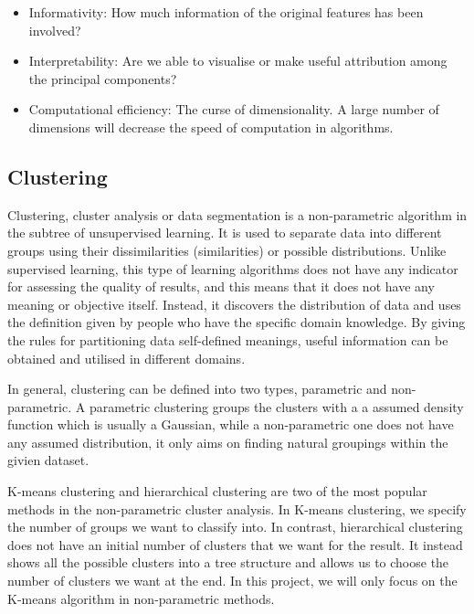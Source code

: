 \documentclass[11pt]{article} %
\theoremstyle{plain}
\theoremstyle{definition}
\begin{document}
\begin{itemize}
  \item Informativity: How much information of the original features has been involved?
  \item Interpretability: Are we able to visualise or make useful attribution among the principal components?
  \item Computational efficiency: The curse of dimensionality. A large number of dimensions will decrease the speed of computation in algorithms.
\end{itemize}



\subsection{Clustering}

Clustering, cluster analysis or data segmentation is a non-parametric algorithm in the subtree of unsupervised learning. It is used to separate data into different groups using their dissimilarities (similarities) or possible distributions. Unlike supervised learning, this type of learning algorithms does not have any indicator for assessing the quality of results, and this means that it does not have any meaning or objective itself. Instead, it discovers the distribution of data and uses the definition given by people who have the specific domain knowledge. By giving the rules for partitioning data self-defined meanings, useful information can be obtained and utilised in different domains\cite{hastie/etal:2009}.

In general, clustering can be defined into two types, parametric and non-parametric. A parametric clustering groups the clusters with a a assumed density function which is usually a Gaussian, while a non-parametric one does not have any assumed distribution, it only aims on finding natural groupings within the givien dataset.

K-means clustering and hierarchical clustering are two of the most popular methods in the non-parametric cluster analysis. In K-means clustering, we specify the number of groups we want to classify into. In contrast, hierarchical clustering does not have an initial number of clusters that we want for the result. It instead shows all the possible clusters into a tree structure and allows us to choose the number of clusters we want at the end. In this project, we will only focus on the K-means algorithm in non-parametric methods.
\end{document}
